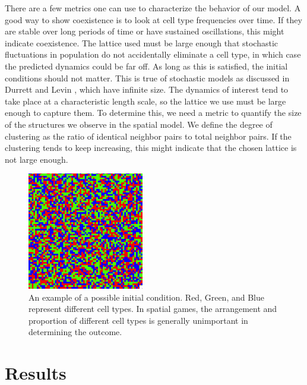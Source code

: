 \documentclass[12pt]{amsart}
\begin{document}
	There are a few metrics one can use to characterize the behavior of our model. A good way to show coexistence is to look at cell type frequencies over time. If they are stable over long periods of time or have sustained oscillations, this might indicate coexistence. The lattice used must be large enough that stochastic fluctuations in population do not accidentally eliminate a cell type, in which case the predicted dynamics could be far off. As long as this is satisfied, the initial conditions should not matter. This is true of stochastic models as discussed in Durrett and Levin \cite{Durrett1994}, which have infinite size. The dynamics of interest tend to take place at a characteristic length scale, so the lattice we use must be large enough to capture them. To determine this, we need a metric to quantify the size of the structures we observe in the spatial model. We define the degree of clustering as the ratio of identical neighbor pairs to total neighbor pairs. If the clustering tends to keep increasing, this might indicate that the chosen lattice is  not large enough.



\begin{figure}[t]
\caption{An example of a possible initial condition. Red, Green, and Blue represent different cell types. In spatial games, the arrangement and proportion of different cell types is generally unimportant in determining the outcome.}
\centering
\includegraphics[width = 2in]{Diagrams/General/even_random_mix}
\end{figure}

\section{Results}
\end{document}
